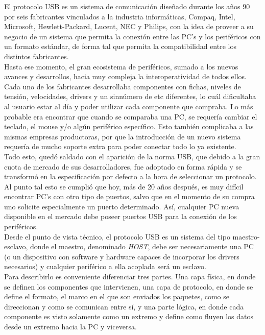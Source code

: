 El protocolo USB es un sistema de comunicación diseñado durante los años 90 por seis fabricantes vinculados a la industria informáticas, Compaq, Intel, Microsoft, Hewlett-Packard, Lucent, NEC y Philips, con la idea de proveer a su negocio de un sistema que permita la conexión entre las PC's y los periféricos con un formato estándar, de forma tal que permita la compatibilidad entre los distintos fabricantes.\\

Hasta ese momento, el gran ecosistema de periféricos, sumado a los nuevos avances y desarrollos, hacia muy compleja la interoperatividad de todos ellos. Cada uno de los fabricantes desarrollaba componentes con fichas, niveles de tensión, velocidades, drivers y un sinnúmero de etc diferentes, lo cuál dificultaba al usuario estar al día y poder utilizar cada componente que compraba. Lo más probable era encontrar que cuando se comparaba una PC, se requería cambiar el teclado, el mouse y/o algún periférico específico. Esto también complicaba a las mismas empresas productoras, por que la introducción de un nuevo sistema requería de mucho soporte extra para poder conectar todo lo ya existente.\\

Todo esto, quedó saldado con el aparición de la norma USB, que debido a la gran cuota de mercado de sus desarrolladores, fue adoptado en forma rápida y se transformó en la especificación por defecto a la hora de seleccionar un protocolo. Al punto tal esto se cumplió que hoy, más de 20 años después, es muy difícil encontrar PC's con otro tipo de puertos, salvo que en el momento de su compra uno solicite especialmente un puerto determinado. Así, cualquier PC nueva disponible en el mercado debe poseer puertos USB para la conexión de los periféricos.\\

Desde el punto de vista técnico, el protocolo USB es un sistema del tipo maestro-esclavo, donde el maestro, denominado {\it HOST}, debe ser necesariamente una PC (o un dispositivo con software y hardware capaces de incorporar los drivers necesarios) y cualquier periférico a ella acoplada será un esclavo\cite{USBspec}.\\

Para describirlo es conveniente diferenciar tres partes. Una capa física, en donde se definen los componentes que intervienen, una capa de protocolo, en donde se define el formato, el marco en el que son enviados los paquetes, como se direccionan y como se comunican entre sí, y una parte lógica, en donde cada componente es visto solamente como un extremo y define como fluyen los datos desde un extremo hacia la PC y viceversa.\\

